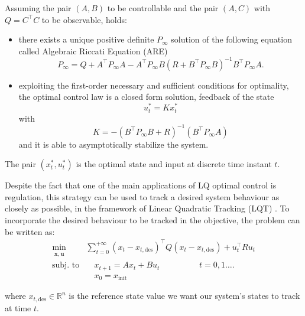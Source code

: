 \documentclass[a4paper,12pt,oneside]{book}
\begin{document}
\bigskip
Assuming the pair $(A,B)$ to be controllable and the pair $(A,C)$ with $Q = C^\top C$ to be observable, holds:
\begin{itemize}
    \item there exists a unique positive definite $P_\infty$ solution of the following equation called Algebraic Riccati Equation (ARE)
    \begin{equation}
        P_\infty = Q + A^\top P_\infty A - A^\top P_\infty B (R + B^\top P_\infty B)^{-1} B^\top P_\infty A.
    \end{equation}
    \item exploiting the first-order necessary and sufficient conditions for optimality, the optimal control law is a closed form solution, feedback of the state
    \begin{equation}
        u_t^* = K x_t^*
    \end{equation}
    with
    \begin{equation}
        K = -( B^\top P_\infty B + R)^{-1}(B^\top P_\infty A)
    \label{eq:Regulator_LQR}
    \end{equation}
    and it is able to asymptotically stabilize the system.
\end{itemize}

The pair $(x_t^*, u_t^*)$ is the optimal state and input at discrete time instant $t$.

\bigskip
Despite the fact that one of the main applications of LQ optimal control is regulation, this strategy can be used to track a desired system behaviour as closely as possible, in the framework of Linear Quadratic Tracking (LQT) \cite{Linear_Quadratic_Tracking}.
To incorporate the desired behaviour to be tracked in the objective, the problem can be written as:
\begin{equation}
\begin{aligned}
	\min_{\substack{\boldsymbol{x}, \boldsymbol{u}}}\quad & \sum_{t=0}^{+\infty}  (x_t - x_{t,\text{des}})^\top Q (x_t - x_{t,\text{des}}) + u_t^\top R u_t  \\
	\text{subj. to} & \quad x_{t+1}  = A x_t + B u_t \hspace{2cm} t = 0, 1 \ldots. \\
    & \quad x_0 = x_{\text{init}}
\end{aligned}
\label{eq:LQR}
\end{equation}

where $x_{t,\text{des}} \in \mathbb{R}^n$ is the reference state value we want our system's states to track at time $t$.
\end{document}
